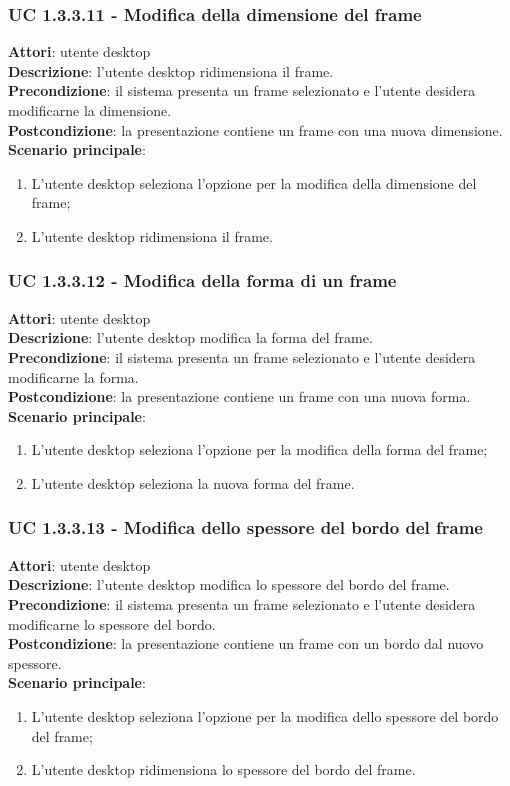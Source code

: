 \subsubsection{UC 1.3.3.11 - Modifica della dimensione del frame}{
	\label{uc1.3.3.11}
	\textbf{Attori}: utente desktop \\
	\textbf{Descrizione}: l'utente desktop ridimensiona il frame. \\
	\textbf{Precondizione}: il sistema presenta un frame selezionato e l'utente desidera modificarne la dimensione.	\\
	\textbf{Postcondizione}: la presentazione contiene un frame con una nuova dimensione.	\\
	\textbf{Scenario principale}:
	\begin{enumerate}
		\item L'utente desktop seleziona l'opzione per la modifica della dimensione del frame;
		\item L'utente desktop ridimensiona il frame.
	\end{enumerate}
	}
\subsubsection{UC 1.3.3.12 - Modifica della forma di un frame}{
	\label{uc1.3.3.12}
	\textbf{Attori}: utente desktop \\
	\textbf{Descrizione}: l'utente desktop modifica la forma del frame. \\
	\textbf{Precondizione}: il sistema presenta un frame selezionato e l'utente desidera modificarne la forma.	\\
	\textbf{Postcondizione}: la presentazione contiene un frame con una nuova forma.	\\
	\textbf{Scenario principale}:
	\begin{enumerate}
		\item L'utente desktop seleziona l'opzione per la modifica della forma del frame;
		\item L'utente desktop seleziona la nuova forma del frame.
	\end{enumerate}}
\subsubsection{UC 1.3.3.13 - Modifica dello spessore del bordo del frame}{
	\label{uc1.3.3.13}
	\textbf{Attori}: utente desktop \\
	\textbf{Descrizione}: l'utente desktop modifica lo spessore del bordo del frame. \\
	\textbf{Precondizione}: il sistema presenta un frame selezionato e l'utente desidera modificarne lo spessore del bordo.	\\
	\textbf{Postcondizione}: la presentazione contiene un frame con un bordo dal nuovo spessore.	\\
	\textbf{Scenario principale}:
	\begin{enumerate}
		\item L'utente desktop seleziona l'opzione per la modifica dello spessore del bordo del frame;
		\item L'utente desktop ridimensiona lo spessore del bordo del frame.
	\end{enumerate}
	}
